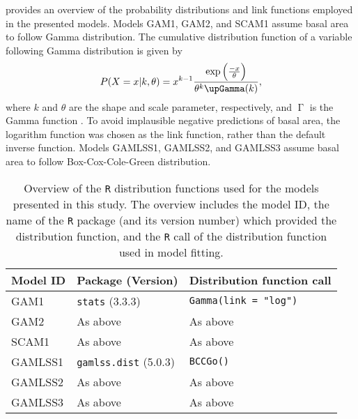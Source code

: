  provides an overview of the probability distributions and link functions employed in the presented models.  Models GAM1, GAM2, and SCAM1 assume basal area to follow Gamma distribution.  The cumulative distribution function of a variable following Gamma distribution is given by
\begin{equation}
  \label{eq:GammaDistributionProbabilityDensityFunction}
  P(X = x|k, \theta) = x^{k - 1} \frac{\exp{\Bigl(\frac{-x}{\theta}\Bigr)}}{\theta^k \upGamma(k)},
\end{equation}
where \(k\) and \(\theta\) are the shape and scale parameter, respectively, and \(\upGamma\) is the Gamma function \parencite{Dormann2013}.  To avoid implausible negative predictions of basal area, the logarithm function was chosen as the link function, rather than the default inverse function.  Models GAMLSS1, GAMLSS2, and GAMLSS3 assume basal area to follow Box-Cox-Cole-Green distribution.  %

\begin{table}[H]
  {\tabulinesep=2mm
    \begin{longtabu}{l l L}
      \caption{Overview of the \texttt{R} distribution functions used for the models presented in this study.  The overview includes
        the model ID,
        the name of the \texttt{R} package (and its version number) which provided the distribution function,
        and the \texttt{R} call of the distribution function used in model fitting.
        \label{tab:PresentedModelsOverviewDistributions}} \\
      \toprule
      Model ID & Package (Version) & Distribution function call \\
      \midrule
      \endhead
      \bottomrule
      \endlastfoot
      GAM1 & \texttt{stats} (3.3.3) & \texttt{Gamma(link = "log")} \\
      GAM2 & As above & As above \\
      SCAM1 & As above & As above \\
      GAMLSS1 & \texttt{gamlss.dist} (5.0.3) & \texttt{BCCGo()} \\
      GAMLSS2 & As above & As above \\
      GAMLSS3 & As above & As above \\
      \bottomrule
    \end{longtabu}}
\end{table}


